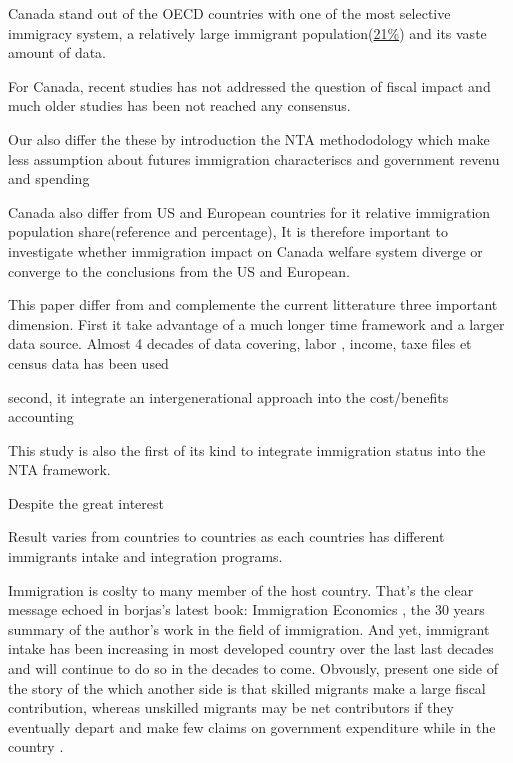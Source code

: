   Canada stand out of the OECD countries with one of the most selective immigracy system, a relatively large immigrant population(\hyperref[note:immig]{21\%\footnotemark}) and its vaste amount of data.


  For Canada, recent studies has not addressed the question of fiscal impact and much older studies has been not reached any consensus.



  Our also differ the these by introduction the NTA methododology which make less assumption about futures immigration characteriscs and government revenu and spending






  Canada also differ from US and European countries for it relative immigration population share(reference and percentage), It is therefore important to investigate whether immigration impact on Canada welfare system diverge or converge to the conclusions from the US and European.


  This paper differ from and complemente the current litterature three important dimension.
  First it take advantage of a much longer time framework and a larger data source. Almost 4 decades of data covering, labor , income, taxe files et census data has been used

  second, it integrate an intergenerational approach into the cost/benefits accounting



  This study is also the first of its kind to integrate immigration status into the NTA framework.

  Despite the great interest

  Result varies from countries to countries as each countries has different immigrants intake and integration programs.

  Immigration is coslty to many member of the host country. That's the clear message echoed in borjas's latest book: Immigration Economics \citep{cardReviewImmigrationEconomics2016}, the 30 years summary of the author's work in the field of immigration. And yet, immigrant intake has been increasing in most developed country over the last last decades and will continue to do so in the decades to come. Obvously,  \citep{Borjas:2014hr} present one side of the story of the which another side is that skilled migrants make a large fiscal contribution, whereas unskilled migrants may be net contributors if they eventually depart and make few claims on government expenditure while in the country \citep{Rowthorn:2008kk}.

